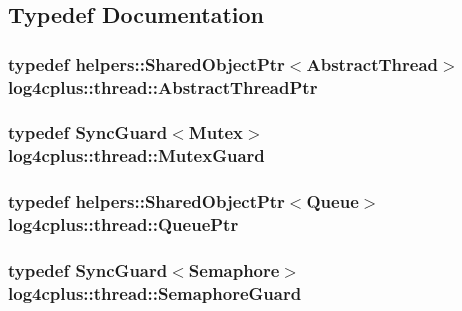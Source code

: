 \subsection{Typedef Documentation}
\hypertarget{namespacelog4cplus_1_1thread_a06509aec895c736c1e3b0736dc8183fb}{
\subsubsection[{Abstract\-Thread\-Ptr}]{\setlength{\rightskip}{0pt plus 5cm}typedef {\bf helpers\-::\-Shared\-Object\-Ptr}$<${\bf Abstract\-Thread}$>$ {\bf log4cplus\-::thread\-::\-Abstract\-Thread\-Ptr}}}\label{namespacelog4cplus_1_1thread_a06509aec895c736c1e3b0736dc8183fb}
\hypertarget{namespacelog4cplus_1_1thread_a8ce7cde94c7a54f5b9e592eb1d4229c2}{
\subsubsection[{Mutex\-Guard}]{\setlength{\rightskip}{0pt plus 5cm}typedef {\bf Sync\-Guard}$<${\bf Mutex}$>$ {\bf log4cplus\-::thread\-::\-Mutex\-Guard}}}\label{namespacelog4cplus_1_1thread_a8ce7cde94c7a54f5b9e592eb1d4229c2}
\hypertarget{namespacelog4cplus_1_1thread_a068fb33b4473fbc7d642ce6ea5a54b7d}{
\subsubsection[{Queue\-Ptr}]{\setlength{\rightskip}{0pt plus 5cm}typedef {\bf helpers\-::\-Shared\-Object\-Ptr}$<${\bf Queue}$>$ {\bf log4cplus\-::thread\-::\-Queue\-Ptr}}}\label{namespacelog4cplus_1_1thread_a068fb33b4473fbc7d642ce6ea5a54b7d}
\hypertarget{namespacelog4cplus_1_1thread_af6c3058cbd378ff5317290189cb822f3}{
\subsubsection[{Semaphore\-Guard}]{\setlength{\rightskip}{0pt plus 5cm}typedef {\bf Sync\-Guard}$<${\bf Semaphore}$>$ {\bf log4cplus\-::thread\-::\-Semaphore\-Guard}}}\label{namespacelog4cplus_1_1thread_af6c3058cbd378ff5317290189cb822f3}
